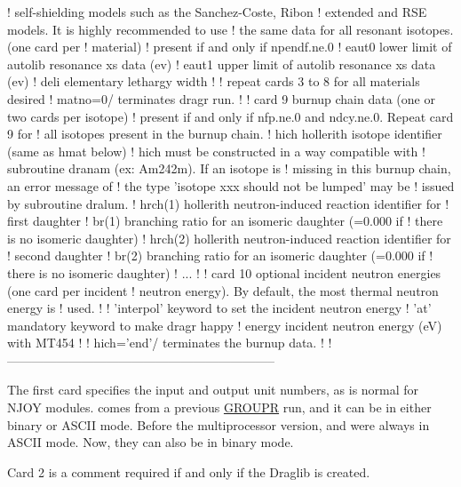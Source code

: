 \begin{ccode}
   !        self-shielding models such as the Sanchez-Coste, Ribon
   !        extended and RSE models. It is highly recommended to use
   !        the same data for all resonant isotopes. (one card per
   !        material)
   ! present if and only if npendf.ne.0
   !   eaut0     lower limit of autolib resonance xs data (ev)
   !   eaut1     upper limit of autolib resonance xs data (ev)
   !   deli      elementary lethargy width
   !
   !            repeat cards 3 to 8 for all materials desired
   !            matno=0/ terminates dragr run.
   !
   ! card 9 burnup chain data (one or two cards per isotope)
   ! present if and only if nfp.ne.0 and ndcy.ne.0. Repeat card 9 for
   ! all isotopes present in the burnup chain.
   !   hich      hollerith isotope identifier (same as hmat below)
   !             hich must be constructed in a way compatible with
   !             subroutine dranam (ex: Am242m). If an isotope is
   !             missing in this burnup chain, an error message of
   !             the type 'isotope xxx should not be lumped' may be
   !             issued by subroutine dralum.
   !   hrch(1)   hollerith neutron-induced reaction identifier for
   !             first daughter
   !   br(1)     branching ratio for an isomeric daughter (=0.000 if
   !             there is no isomeric daughter)
   !   hrch(2)   hollerith neutron-induced reaction identifier for
   !             second daughter
   !   br(2)     branching ratio for an isomeric daughter (=0.000 if
   !             there is no isomeric daughter)
   !  ...
   !
   ! card 10 optional incident neutron energies (one card per incident
   ! neutron energy). By default, the most thermal neutron energy is
   ! used.
   !
   !  'interpol' keyword to set the incident neutron energy
   !  'at'       mandatory keyword to make dragr happy
   !   energy    incident neutron energy (eV) with MT454
   !
   ! hich='end'/ terminates the burnup data.
   !
   !-----------------------------------------------------------------

\end{ccode}
\normalsize

The first card specifies the input and output unit numbers, as
is normal for NJOY modules.   comes from a previous
\hyperlink{sGROUPRhy}{GROUPR} run, and it can be in
either binary or ASCII mode.
Before the multiprocessor version,  and 
were always in ASCII mode. Now, they can also be in binary mode.

Card 2 is a comment required if and only if the Draglib is created.


